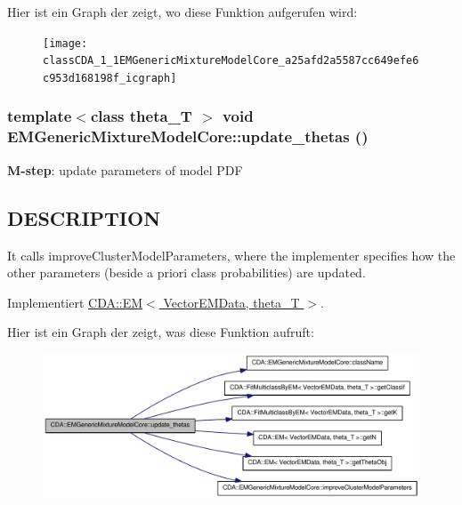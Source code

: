 Hier ist ein Graph der zeigt, wo diese Funktion aufgerufen wird:\nopagebreak
\begin{figure}[H]
\begin{center}
\leavevmode
\texttt{[image: classCDA\_1\_1EMGenericMixtureModelCore\_a25afd2a5587cc649efe6c953d168198f\_icgraph]}
\end{center}
\end{figure}


\hypertarget{classCDA_1_1EMGenericMixtureModelCore_a12c68e86652d9a723ca0716f7676b360}{
\subsubsection[{update\_\-thetas}]{\setlength{\rightskip}{0pt plus 5cm}template$<$class theta\_\-T $>$ void EMGenericMixtureModelCore::update\_\-thetas ()}}
\label{classCDA_1_1EMGenericMixtureModelCore_a12c68e86652d9a723ca0716f7676b360}


{\bfseries M-\/step}: update parameters of model PDF 

\hypertarget{ProbabilisticClustering_8h_09_09_DESCRIPTION}{}\subsection{DESCRIPTION}\label{ProbabilisticClustering_8h_09_09_DESCRIPTION}
It calls improveClusterModelParameters, where the implementer specifies how the other parameters (beside a priori class probabilities) are updated. 

Implementiert \hyperlink{classCDA_1_1EM_a479e5c57713312a4089e89bb522e2769}{CDA::EM$<$ VectorEMData, theta\_\-T $>$}.



Hier ist ein Graph der zeigt, was diese Funktion aufruft:\nopagebreak
\begin{figure}[H]
\begin{center}
\leavevmode
\includegraphics[width=317pt]{classCDA_1_1EMGenericMixtureModelCore_a12c68e86652d9a723ca0716f7676b360_cgraph}
\end{center}
\end{figure}




